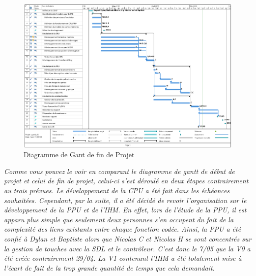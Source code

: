 \begin{figure}[h]
   \includegraphics[scale=0.45]{GantV2.png}
   \caption{\label{étiquette} Diagramme de Gant de fin de Projet}
\end{figure}

\emph{  Comme vous pouvez le voir en comparant le diagramme de gantt de début de projet et celui de fin de projet, celui-ci s'est déroulé en deux étapes contrairement au trois prévues. Le développement de la CPU a été fait dans les échéances souhaitées. Cependant, par la suite, il a été décidé de revoir l'organisation sur le développement de la PPU et de l'IHM. En effet, lors de l'étude de la PPU, il est apparu plus simple que seulement deux personnes s'en occupent du fait de la complexité des liens existants entre chaque fonction codée. Ainsi, la PPU a été confié à Dylan et Baptiste alors que Nicolas C et Nicolas H se sont concentrés sur la gestion de touches avec la SDL et le contrôleur. C'est donc le 7/05 que la V0 a été créée contrairement 29/04. La V1 contenant l'IHM a été totalement mise à l'écart de fait de la trop grande quantité de temps que cela demandait.}
